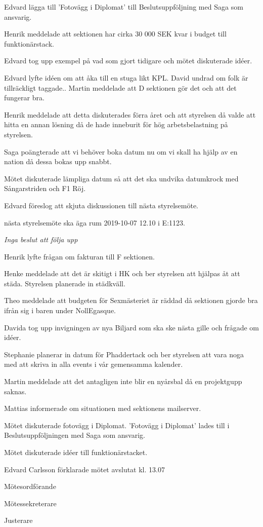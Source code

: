\documentclass[10pt]{article}
\def\mo{Edvard Carlsson}
\def\ms{Mattias Lundström}
\def\ji{Henrik Ramström}
\begin{document}
\begin{paragrafer}
Edvard \ypa lägga till 'Fotovägg i Diplomat' till Beslutsuppföljning med Saga som ansvarig. 

\Mbaby



Henrik meddelade att sektionen har cirka 30 000 SEK kvar i budget till funktionärstack. 

Edvard tog upp exempel på vad som gjort tidigare och mötet diskuterade idéer. 

Edvard lyfte idéen om att åka till en stuga likt KPL. David undrad om folk är tillräckligt taggade.. Martin meddelade att D sektionen gör det och att det fungerar bra. 

Henrik meddelade att detta diskuterades förra året och att styrelsen då valde att hitta en annan lösning då de hade inneburit för hög arbetsbelastning på styrelsen. 

Saga poängterade att vi behöver boka datum nu om vi skall ha hjälp av en nation då dessa bokas upp snabbt. 

Mötet diskuterade lämpliga datum så att det ska undvika datumkrock med Sångarstriden och F1 Röj. 

Edvard föreslog att skjuta diskussionen till nästa styrelsemöte. 

\Mba nästa styrelsemöte ska äga rum 2019-10-07 12.10 i E:1123.

\textit{Inga beslut att följa upp}

Henrik lyfte frågan om fakturan till F sektionen.

Henke meddelade att det är skitigt i HK och ber styrelsen att hjälpas åt att städa. Styrelsen planerade in städkväll.

Theo meddelade att budgeten för Sexmästeriet är räddad då sektionen gjorde bra ifrån sig i baren under NollEgasque.

Davida tog upp invigningen av nya Biljard som ska ske nästa gille och frågade om idéer.

Stephanie planerar in datum för Phaddertack och ber styrelsen att vara noga med att skriva in alla events i vår gemensamma kalender. 

Martin meddelade att det antagligen inte blir en nyårsbal då en projektgupp saknas. 

Mattias informerade om situationen med sektionens mailserver. 

Mötet diskuterade fotovägg i Diplomat. 'Fotovägg i Diplomat' lades till i Beslutsuppföljningen med Saga som ansvarig. 

Mötet diskuterade idéer till funktionärstacket. 

{\mo} förklarade mötet avslutat kl. 13.07
\end{paragrafer}

\hidesignfoot
\begin{signatures}{3}
\signature{\mo}{Mötesordförande}
\signature{\ms}{Mötessekreterare}
\signature{\ji}{Justerare}
\end{signatures}
\end{document}
